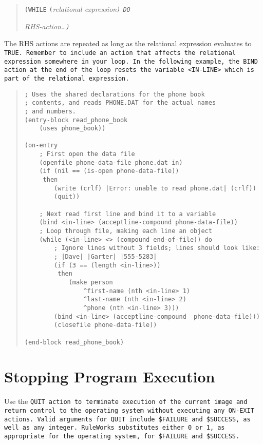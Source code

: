 \begin{quote}
\verb|(WHILE| \verb|(|\it{relational-expression}\verb|)| \verb|DO|\par
\qquad\it{RHS-action}\ldots\verb|)|
\end{quote}

The RHS actions are repeated as long as the relational expression
evaluates to \tt{TRUE}.  Remember to include an action that affects the
relational expression somewhere in your loop.  In the following
example, the \tt{BIND} action at the end of the
loop resets the variable \verb|<IN-LINE>| which is part of the relational
expression.

\begin{quote}
\begin{verbatim}
; Uses the shared declarations for the phone book
; contents, and reads PHONE.DAT for the actual names
; and numbers.
(entry-block read_phone_book
    (uses phone_book))

(on-entry 
    ; First open the data file
    (openfile phone-data-file phone.dat in)
    (if (nil == (is-open phone-data-file))
     then
        (write (crlf) |Error: unable to read phone.dat| (crlf))
        (quit))

    ; Next read first line and bind it to a variable
    (bind <in-line> (acceptline-compound phone-data-file))
    ; Loop through file, making each line an object
    (while (<in-line> <> (compound end-of-file)) do
        ; Ignore lines without 3 fields; lines should look like:
        ; |Dave| |Garter| |555-5283|
        (if (3 == (length <in-line>))
         then
            (make person
                ^first-name (nth <in-line> 1)
                ^last-name (nth <in-line> 2)
                ^phone (nth <in-line> 3)))
        (bind <in-line> (acceptline-compound  phone-data-file)))
        (closefile phone-data-file))

(end-block read_phone_book)
\end{verbatim}
\end{quote}

\section{Stopping Program Execution}

Use the \tt{QUIT} action to terminate execution of the current image
and return control to the operating system without executing any
\tt{ON-EXIT} actions. Valid arguments for \tt{QUIT} include
\verb|$FAILURE| and \verb|$SUCCESS|, as well as any integer.
RuleWorks substitutes either 0 or 1, as appropriate for the operating
system, for \verb|$FAILURE| and \verb|$SUCCESS|.

